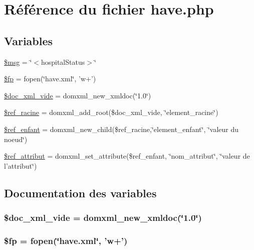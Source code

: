 \hypertarget{have_8php}{
\section{R\'{e}f\'{e}rence du fichier have.php}
\label{have_8php}
}
\subsection*{Variables}
\begin{CompactItemize}
\item 
\hyperlink{have_8php_a0}{\$msg} = \char`\"{}$<$hospital\-Status$>$\char`\"{}
\item 
\hyperlink{have_8php_a1}{\$fp} = fopen(\char`\"{}have.xml\char`\"{}, 'w+')
\item 
\hyperlink{have_8php_a2}{\$doc\_\-xml\_\-vide} = domxml\_\-new\_\-xmldoc(\char`\"{}1.0\char`\"{})
\item 
\hyperlink{have_8php_a3}{\$ref\_\-racine} = domxml\_\-add\_\-root(\$doc\_\-xml\_\-vide, \char`\"{}element\_\-racine\char`\"{})
\item 
\hyperlink{have_8php_a4}{\$ref\_\-enfant} = domxml\_\-new\_\-child(\$ref\_\-racine,\char`\"{}element\_\-enfant\char`\"{}, \char`\"{}valeur du noeud\char`\"{})
\item 
\hyperlink{have_8php_a5}{\$ref\_\-attribut} = domxml\_\-set\_\-attribute(\$ref\_\-enfant, \char`\"{}nom\_\-attribut\char`\"{}, \char`\"{}valeur de l'attribut\char`\"{})
\end{CompactItemize}


\subsection{Documentation des variables}
\hypertarget{have_8php_a2}{
\subsubsection[\$doc\_\-xml\_\-vide]{\setlength{\rightskip}{0pt plus 5cm}\$doc\_\-xml\_\-vide = domxml\_\-new\_\-xmldoc(\char`\"{}1.0\char`\"{})}}
\label{have_8php_a2}


\hypertarget{have_8php_a1}{
\subsubsection[\$fp]{\setlength{\rightskip}{0pt plus 5cm}\$fp = fopen(\char`\"{}have.xml\char`\"{}, 'w+')}}
\label{have_8php_a1}


